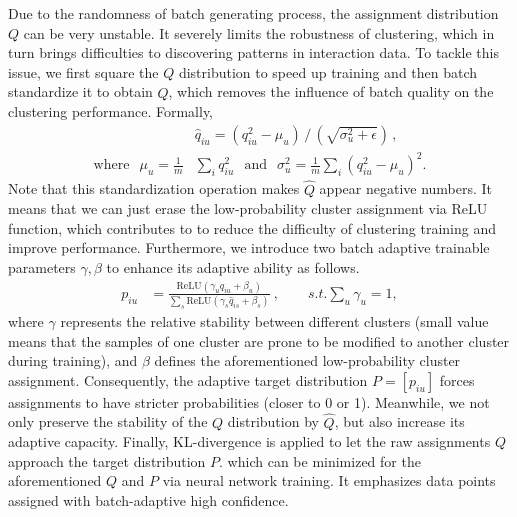 \documentclass[11pt]{article}
\begin{document}
Due to the randomness of batch generating process, the assignment distribution $Q$ can be very unstable. It severely limits the robustness of clustering, which in turn brings difficulties to discovering patterns in interaction data. To tackle this issue, we first square the $Q$ distribution to speed up training and then batch standardize it to obtain $\hat{Q}$, which removes the influence of batch quality on the clustering performance. Formally,
\begin{align}
	& \widehat{q}_{iu}  = ({q^2_{iu}-\mu_{u}}) \, / \, ({\sqrt{\sigma_{u}^{2}+\epsilon}}) \, , \\
	\text{where }\ \,  \mu_{u}  = \frac{1}{m} &\sum\nolimits_{i} q^2_{iu} \ \, \text{ and } \ \,
	\sigma_{u}^{2}  = \frac{1}{m} \sum\nolimits_{i}\left(q^2_{iu}-\mu_{u}\right)^{2} .
\end{align}
Note that this standardization operation makes $\hat{Q}$ appear negative numbers. It means that we can just erase the low-probability cluster assignment via ReLU function, which contributes to to reduce the difficulty of clustering training and improve performance. Furthermore, we introduce two batch adaptive trainable parameters $ \gamma, \beta $ to enhance its adaptive ability as follows.
\begin{align}
	p_{iu} & = \frac{\text{ReLU}( \gamma_{u}  \widehat{q}_{iu} + \beta_{u} )}{\sum\nolimits_{s} \text{ReLU}( \gamma_{s}  \widehat{q}_{is} + \beta_{s} )} \ , \qquad s.t. \sum\nolimits_u \gamma_u = 1  ,
\end{align}
where $\gamma $ represents the relative stability between different clusters (small value means that the samples of one cluster are prone to be modified to another cluster during training), and $\beta$ defines the aforementioned low-probability cluster assignment. Consequently, the adaptive target distribution $ P = [p_{i u}] $ forces assignments to have stricter probabilities (closer to 0 or 1). Meanwhile, we not only preserve the stability of the $Q$ distribution by $\hat{Q}$, but also increase its adaptive capacity. Finally, KL-divergence is applied to let the raw assignments $Q$ approach the target distribution $P$.
which can be minimized for the aforementioned $Q$ and $P$ via neural network training. It emphasizes data points assigned with batch-adaptive high confidence.
\end{document}
